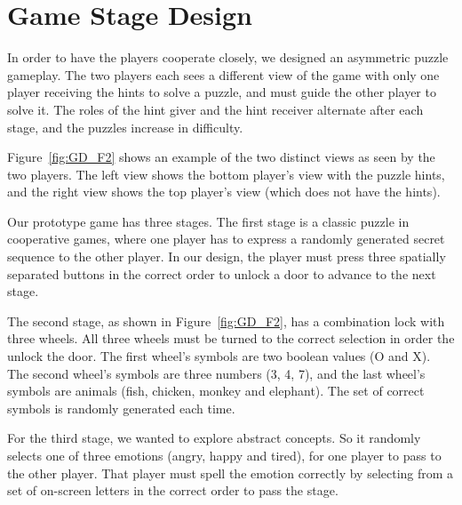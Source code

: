 \section{Game Stage Design}


In order to have the players cooperate closely, we designed an asymmetric puzzle gameplay. The two players each sees a different view of the game with only one player receiving the hints to solve a puzzle, and must guide the other player to solve it. The roles of the hint giver and the hint receiver alternate after each stage, and the puzzles increase in difficulty. 

Figure~\ref{fig:GD_F2} shows an example of the two distinct views as seen by the two players. The left view shows the bottom player's view with the puzzle hints, and the right view shows the top player's view (which does not have the hints). 

Our prototype game has three stages. The first stage is a classic puzzle in cooperative games, where one player has to express a randomly generated secret sequence to the other player. In our design, the player must press three spatially separated buttons in the correct order to unlock a door to advance to the next stage.

The second stage, as shown in Figure~\ref{fig:GD_F2}, has a combination lock with three wheels. All three wheels must be turned to the correct selection in order the unlock the door. The first wheel's symbols are two boolean values (O and X). The second wheel's symbols are three numbers (3, 4, 7), and the last wheel's symbols are animals (fish, chicken, monkey and elephant). The set of correct symbols is randomly generated each time.

For the third stage, we wanted to explore abstract concepts. So it randomly selects one of three emotions (angry, happy and tired), for one player to pass to the other player. That player must spell the emotion correctly by selecting from a set of on-screen letters in the correct order to pass the stage.